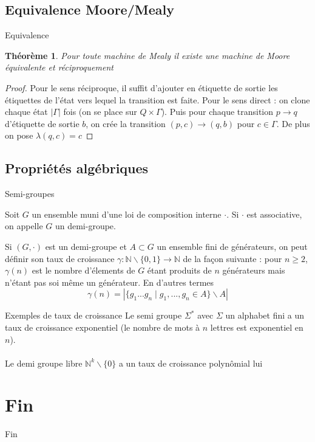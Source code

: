 \documentclass{beamer}
\newtheorem{thm}{Théorème}
\begin{document}
\subsection{Equivalence Moore/Mealy}

\begin{frame}{Equivalence}
    \begin{thm}
        Pour toute machine de Mealy il existe une machine de Moore équivalente et réciproquement
    \end{thm}
    \begin{proof}
        Pour le sens réciproque, il suffit d'ajouter en étiquette de sortie les étiquettes de l'état vers lequel la transition est faite.
        Pour le sens direct : on clone chaque état $|\Gamma|$ fois (on se place sur $Q \times \Gamma$). Puis pour chaque transition $p \rightarrow q$ d'étiquette
        de sortie $b$, on crée la transition $(p, c) \rightarrow (q, b)$ pour $c \in \Gamma$. De plus on pose $\lambda(q, c) = c$
    \end{proof}
\end{frame}

\subsection{Propriétés algébriques}

\begin{frame}{Semi-groupes}
    \begin{definition}
        Soit $G$ un ensemble muni d'une loi de composition interne $\cdot$. Si $\cdot$ est associative, on appelle $G$ un demi-groupe.
    \end{definition}

    \begin{definition}
        Si $(G, \cdot)$ est un demi-groupe et $A \subset G$ un ensemble fini de générateurs, on peut définir son taux de croissance
        $\gamma : \mathbb{N} \backslash \{0, 1\} \rightarrow \mathbb{N}$ de la façon suivante : pour $n \geq 2$, $\gamma(n)$ est le nombre d'élements
        de $G$ étant produits de $n$ générateurs mais n'étant pas soi même un générateur. En d'autres termes
        \[ \gamma(n) = |\{ g_1 ... g_n \mid g_1, ..., g_n \in A \} \backslash A| \]
    \end{definition}
\end{frame}

\begin{frame}{Exemples de taux de croissance}
    Le semi groupe $\Sigma^*$ avec $\Sigma$ un alphabet fini a un taux de croissance exponentiel (le nombre de mots à $n$ lettres est exponentiel en $n$).
    \\~\\
    Le demi groupe libre $\mathbb{N}^k \backslash \{0\}$ a un taux de croissance polynômial lui
\end{frame}

\section*{Fin}

\begin{frame}{Fin}
    
\end{frame}
\end{document}
